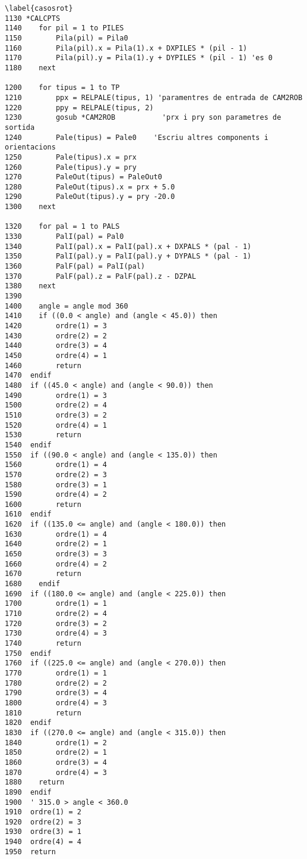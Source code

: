 \begin{verbatim}\label{casosrot}
1130 *CALCPTS
1140    for pil = 1 to PILES
1150        Pila(pil) = Pila0
1160        Pila(pil).x = Pila(1).x + DXPILES * (pil - 1)
1170        Pila(pil).y = Pila(1).y + DYPILES * (pil - 1) 'es 0
1180    next

1200    for tipus = 1 to TP
1210        ppx = RELPALE(tipus, 1) 'paramentres de entrada de CAM2ROB
1220        ppy = RELPALE(tipus, 2)
1230        gosub *CAM2ROB           'prx i pry son parametres de sortida
1240        Pale(tipus) = Pale0    'Escriu altres components i orientacions
1250        Pale(tipus).x = prx
1260        Pale(tipus).y = pry
1270        PaleOut(tipus) = PaleOut0
1280        PaleOut(tipus).x = prx + 5.0
1290        PaleOut(tipus).y = pry -20.0
1300    next

1320    for pal = 1 to PALS
1330        PalI(pal) = Pal0
1340        PalI(pal).x = PalI(pal).x + DXPALS * (pal - 1)
1350        PalI(pal).y = PalI(pal).y + DYPALS * (pal - 1)
1360        PalF(pal) = PalI(pal)
1370        PalF(pal).z = PalF(pal).z - DZPAL
1380    next
1390 	
1400    angle = angle mod 360
1410 	if ((0.0 < angle) and (angle < 45.0)) then
1420        ordre(1) = 3
1430        ordre(2) = 2
1440        ordre(3) = 4
1450        ordre(4) = 1
1460        return
1470  endif
1480  if ((45.0 < angle) and (angle < 90.0)) then 
1490        ordre(1) = 3
1500        ordre(2) = 4
1510        ordre(3) = 2
1520        ordre(4) = 1
1530        return
1540  endif
1550  if ((90.0 < angle) and (angle < 135.0)) then
1560        ordre(1) = 4
1570        ordre(2) = 3
1580        ordre(3) = 1
1590        ordre(4) = 2
1600        return
1610  endif
1620  if ((135.0 <= angle) and (angle < 180.0)) then
1630        ordre(1) = 4
1640        ordre(2) = 1
1650        ordre(3) = 3
1660        ordre(4) = 2
1670 		return
1680 	endif
1690  if ((180.0 <= angle) and (angle < 225.0)) then 
1700        ordre(1) = 1
1710        ordre(2) = 4
1720        ordre(3) = 2
1730        ordre(4) = 3
1740        return
1750  endif
1760  if ((225.0 <= angle) and (angle < 270.0)) then
1770        ordre(1) = 1
1780        ordre(2) = 2
1790        ordre(3) = 4
1800        ordre(4) = 3
1810        return
1820  endif
1830  if ((270.0 <= angle) and (angle < 315.0)) then 
1840        ordre(1) = 2
1850        ordre(2) = 1
1860        ordre(3) = 4
1870        ordre(4) = 3
1880 	return
1890  endif
1900  ' 315.0 > angle < 360.0
1910  ordre(1) = 2
1920  ordre(2) = 3
1930  ordre(3) = 1
1940  ordre(4) = 4
1950  return
\end{verbatim}

